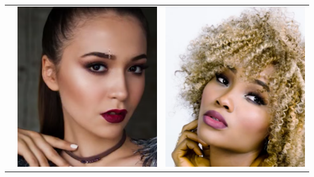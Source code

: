\begin{table}[H]
\begin{tabular}{|c|c|c|}
\begin{minipage}{.29\textwidth}
  \end{minipage} & 
  \begin{minipage}{.29\textwidth}
    \includegraphics[width=\textwidth,height=\textheight,keepaspectratio]{images/match_other_2_targ}
  \end{minipage} & 
  \begin{minipage}{.29\textwidth}
    \includegraphics[width=\textwidth,height=\textheight,keepaspectratio]{images/match_other_2_res}

\end{minipage}
\end{tabular}
\end{table}
